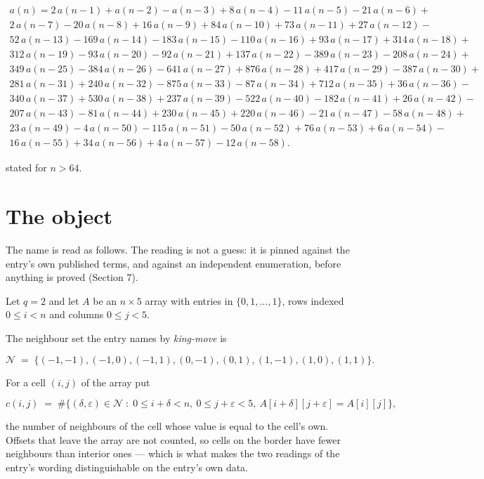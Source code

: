 \documentclass[11pt]{article}
\theoremstyle{definition}
\begin{document}
\begin{multline*} a(n) = 2\,a(n-1) + a(n-2) - a(n-3) + 8\,a(n-4) - 11\,a(n-5) - 21\,a(n-6) + \\ 2\,a(n-7) - 20\,a(n-8) + 16\,a(n-9) + 84\,a(n-10) + 73\,a(n-11) + 27\,a(n-12) - \\ 52\,a(n-13) - 169\,a(n-14) - 183\,a(n-15) - 110\,a(n-16) + 93\,a(n-17) + 314\,a(n-18) + \\ 312\,a(n-19) - 93\,a(n-20) - 92\,a(n-21) + 137\,a(n-22) - 389\,a(n-23) - 208\,a(n-24) + \\ 349\,a(n-25) - 384\,a(n-26) - 641\,a(n-27) + 876\,a(n-28) + 417\,a(n-29) - 387\,a(n-30) + \\ 281\,a(n-31) + 240\,a(n-32) - 875\,a(n-33) - 87\,a(n-34) + 712\,a(n-35) + 36\,a(n-36) - \\ 340\,a(n-37) + 530\,a(n-38) + 237\,a(n-39) - 522\,a(n-40) - 182\,a(n-41) + 26\,a(n-42) - \\ 207\,a(n-43) - 81\,a(n-44) + 230\,a(n-45) + 220\,a(n-46) - 21\,a(n-47) - 58\,a(n-48) + \\ 23\,a(n-49) - 4\,a(n-50) - 115\,a(n-51) - 50\,a(n-52) + 76\,a(n-53) + 6\,a(n-54) - \\ 16\,a(n-55) + 34\,a(n-56) + 4\,a(n-57) - 12\,a(n-58). \end{multline*}

stated for $n > 64$.

\section{The object}

The name is read as follows. The reading is not a guess: it is pinned against the entry's own published terms, and against an independent enumeration, before anything is proved (Section 7).

Let $q = 2$ and let $A$ be an $n \times 5$ array with entries in $\{0,1,\dots,1\}$, rows indexed $0 \le i < n$ and columns $0 \le j < 5$.

The neighbour set the entry names by {\itshape king-move} is

\[\mathcal{N} \;=\; \{(-1,-1), (-1,0), (-1,1), (0,-1), (0,1), (1,-1), (1,0), (1,1)\}.\]

For a cell $(i,j)$ of the array put

\[c(i,j) \;=\; \#\bigl\{(\delta,\varepsilon)\in\mathcal{N} \;:\; 0\le i+\delta<n,\ 0\le j+\varepsilon<5,\ A[i+\delta][j+\varepsilon] = A[i][j]\bigr\},\]

the number of neighbours of the cell whose value is equal to the cell's own. Offsets that leave the array are not counted, so cells on the border have fewer neighbours than interior ones --- which is what makes the two readings of the entry's wording distinguishable on the entry's own data.
\end{document}
